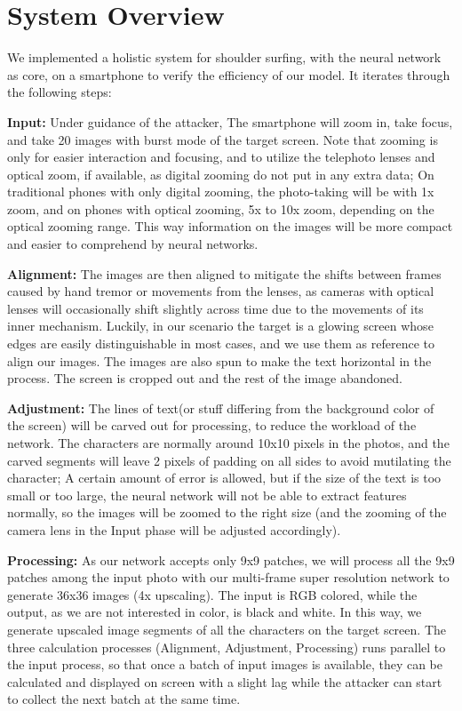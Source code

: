 \section{System Overview}
\label{sec-system-overview} 
We implemented a holistic system for shoulder surfing, with the neural network as core, on a smartphone to verify the efficiency of our model. It iterates through the following steps: 

\vspace{1mm}
\noindent
\textbf{Input:} Under guidance of the attacker, The smartphone will zoom in, take focus, and take 20 images with burst mode of the target screen. Note that zooming is only for easier interaction and focusing, and to utilize the telephoto lenses and optical zoom, if available, as digital zooming do not put in any extra data; On traditional phones with only digital zooming, the photo-taking will be with 1x zoom, and on phones with optical zooming, 5x to 10x zoom, depending on the optical zooming range. This way information on the images will be more compact and easier to comprehend by neural networks.

\vspace{1mm}
\noindent
\textbf{Alignment:} The images are then aligned to mitigate the shifts between frames caused by hand tremor or movements from the lenses, as cameras with optical lenses will occasionally shift slightly across time due to the movements of its inner mechanism. Luckily, in our scenario the target is a glowing screen whose edges are easily distinguishable in most cases, and we use them as reference to align our images. The images are also spun to make the text horizontal in the process. The screen is cropped out and the rest of the image abandoned.


\vspace{1mm}
\noindent
\textbf{Adjustment:} The lines of text(or stuff differing from the background color of the screen) will be carved out for processing, to reduce the workload of the network. The characters are normally around 10x10 pixels in the photos, and the carved segments will leave 2 pixels of padding on all sides to avoid mutilating the character; A certain amount of error is allowed, but if the size of the text is too small or too large, the neural network will not be able to extract features normally, so the images will be zoomed to the right size (and the zooming of the camera lens in the Input phase will be adjusted accordingly).


\vspace{1mm}
\noindent
\textbf{Processing:} As our network accepts only 9x9 patches, we will process all the 9x9 patches among the input photo with our multi-frame super resolution network to generate 36x36 images (4x upscaling). The input is RGB colored, while the output, as we are not interested in color, is black and white. In this way, we generate upscaled image segments of all the characters on the target screen. The three calculation processes (Alignment, Adjustment, Processing) runs parallel to the input process, so that once a batch of input images is available, they can be calculated and displayed on screen with a slight lag while the attacker can start to collect the next batch at the same time.
		
